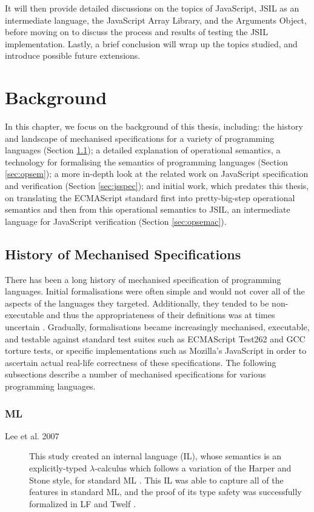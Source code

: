\documentclass[a4paper,11pt,twoside]{report}
\newif\ifComments
\newcommand{\pmax}[1]{%
\ifComments
\begin{center}
\fbox{%
\begin{minipage}{3in} \color{blue}
{\bf PM:} {\rm #1}
\end{minipage}
}
\end{center}
\fi
}
\begin{document}
\pmax{Polish as structure finalises.}

It will then provide detailed discussions on the topics of JavaScript, JSIL as an intermediate language, the JavaScript Array Library, and the Arguments Object, before moving on to discuss the process and results of testing the JSIL implementation. Lastly, a brief conclusion will wrap up the topics studied, and introduce possible future extensions. 



\chapter{Background} \label{cha:bckgnd}
In this chapter, we focus on the background of this thesis, including: the history and landscape of mechanised specifications for a variety of programming languages (Section \ref{sec:hist}); a detailed explanation of operational semantics, a technology for formalising the semantics of programming languages (Section \ref{sec:opsem}); a more in-depth look at the related work on JavaScript specification and verification (Section \ref{sec:jsspec}); and initial work, which predates this thesis, on translating the ECMAScript standard first into pretty-big-step operational semantics and then from this operational semantics to JSIL, an intermediate language for JavaScript verification (Section \ref{sec:opsemac}).

\section{History of Mechanised Specifications}\label{sec:hist}
There has been a long history of mechanised specification of programming languages. Initial formalisations were often simple and would not cover all of the aspects of the languages they targeted. Additionally, they tended to be non-executable and thus the appropriateness of their definitions was at times uncertain \cite{Ellison:2012}. Gradually, formalisations became increasingly mechanised, executable, and testable against standard test suites such as ECMAScript Test262 and GCC torture tests, or specific implementations such as Mozilla's JavaScript in order to ascertain actual real-life correctness of these specifications. The following subsections describe a number of mechanised specifications for various programming languages.

\subsection{ML}
\begin{description}
\item[Lee et al. 2007] This study created an internal language (IL), whose semantics is an explicitly-typed $\lambda$-calculus which follows a variation of the Harper and Stone\cite{Harper:2000} style, for standard ML \cite{Lee:2007}. This IL was able to capture all of the features in standard ML, and the proof of its type safety was successfully formalized in LF \cite{Harper:1993} and Twelf \cite{Pfenning98guide}.
\end{description}
\end{document}
